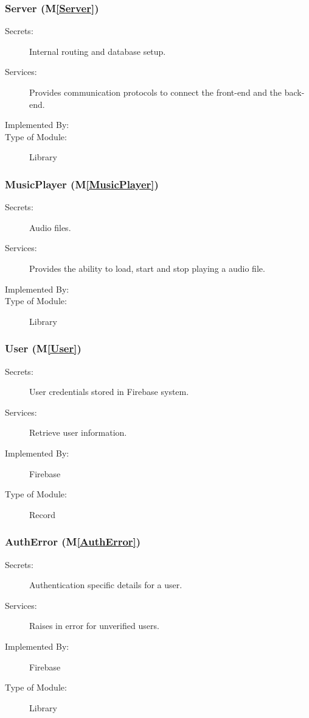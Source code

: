 \documentclass[12pt, titlepage]{article}
\newcommand{\mref}[1]{M\ref{#1}}
\begin{document}
\subsubsection{Server (\mref{Server})}

\begin{description}
\item[Secrets:] Internal routing and database setup.
\item[Services:] Provides communication protocols to connect the front-end and the back-end.
\item[Implemented By:]  \progname
\item[Type of Module:] Library
\end{description}

\subsubsection{MusicPlayer (\mref{MusicPlayer})}

\begin{description}
\item[Secrets:] Audio files.
\item[Services:] Provides the ability to load, start and stop playing a audio file.
\item[Implemented By:]  \progname
\item[Type of Module:] Library
\end{description}

\subsubsection{User (\mref{User})}

\begin{description}
\item[Secrets:] User credentials stored in Firebase system.
\item[Services:] Retrieve user information.
\item[Implemented By:]  Firebase
\item[Type of Module:] Record
\end{description}

\subsubsection{AuthError (\mref{AuthError})}

\begin{description}
\item[Secrets:] Authentication specific details for a user.
\item[Services:] Raises in error for unverified users.
\item[Implemented By:]  Firebase
\item[Type of Module:] Library
\end{description}
\end{document}
